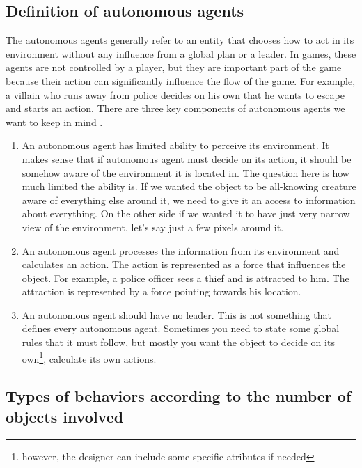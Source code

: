 \documentclass[10pt,twoside,english,a4paper]{article}
\begin{document}
\subsection{Definition of autonomous agents} \label{definition of a.a.}

The autonomous agents generally refer to an entity that chooses how to act in its environment without any influence from a global plan or a leader. In games, these agents are not controlled by a player, but they are important part of the game because their action can significantly influence the flow of the game. For example, a villain who runs away from police decides on his own that he wants to escape and starts an action. There are three key components of autonomous agents we want to keep in mind \cite{Verhagen}. 

\begin{enumerate}
\item An autonomous agent has limited ability to perceive its environment. It makes sense that if autonomous agent must decide on its action, it should be somehow aware of the environment it is located in. The question here is how much limited the ability is. If we wanted the object to be all-knowing creature aware of everything else around it, we need to give it an access to information about everything. On the other side if we wanted it to have just very narrow view of the environment, let’s say just a few pixels around it.

\item An autonomous agent processes the information from its environment and calculates an action. The action is represented as a force that influences the object. For example, a police officer sees a thief and is attracted to him. The attraction is represented by a force pointing towards his location. 

\item An autonomous agent should have no leader. This is not something that defines every autonomous agent. Sometimes you need to state some global rules that it must follow, but mostly you want the object to decide on its own\footnote{however, the designer can include some specific atributes if needed}, calculate its own actions.

\end{enumerate}

\subsection{Types of behaviors according to the number of objects involved} \label{types of behaviors}
\end{document}
